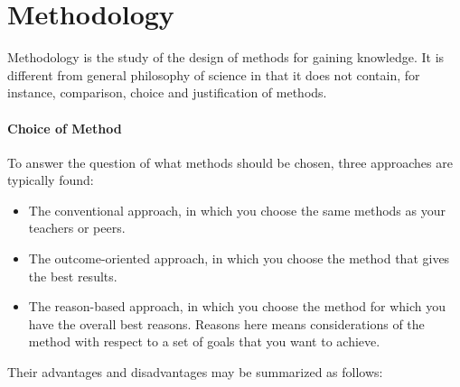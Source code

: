 \section{Methodology}

Methodology is the study of the design of methods for gaining knowledge. It is different from general philosophy of science in that it does not contain, for instance, comparison, choice and justification of methods.

\paragraph{Choice of Method}
To answer the question of what methods should be chosen, three approaches are typically found:
\begin{itemize}
	\item The conventional approach, in which you choose the same methods as your teachers or peers.
	\item The outcome-oriented approach, in which you choose the method that gives the best results.
	\item The reason-based approach, in which you choose the method for which you have the overall best reasons. Reasons here means considerations of the method with respect to a set of goals that you want to achieve.
\end{itemize}

Their advantages and disadvantages may be summarized as follows:

